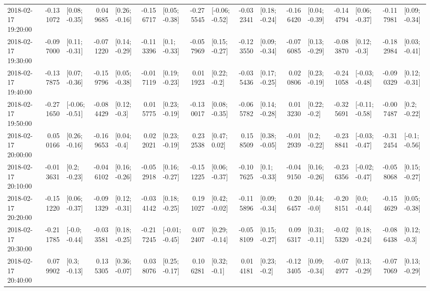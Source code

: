 \begin{tabular}{lrlrlrlrlrlrlrlrl}
2018-02-17 19:20:00 & -0.131072 &   [0.08; -0.35] &  0.049685 &   [0.26; -0.16] & -0.156717 &   [0.05; -0.38] & -0.275545 &  [-0.06; -0.52] & -0.032341 &   [0.18; -0.24] & -0.166420 &   [0.04; -0.39] & -0.144794 &   [0.06; -0.37] & -0.117981 &   [0.09; -0.34] \\
2018-02-17 19:30:00 & -0.097000 &   [0.11; -0.31] & -0.071220 &   [0.14; -0.29] & -0.113396 &    [0.1; -0.33] & -0.057969 &   [0.15; -0.27] & -0.123550 &   [0.09; -0.34] & -0.076085 &   [0.13; -0.29] & -0.083870 &    [0.12; -0.3] & -0.182984 &   [0.03; -0.41] \\
2018-02-17 19:40:00 & -0.137875 &   [0.07; -0.36] & -0.159796 &   [0.05; -0.38] & -0.017119 &   [0.19; -0.23] &  0.011923 &    [0.22; -0.2] & -0.035436 &   [0.17; -0.25] &  0.020806 &   [0.23; -0.19] & -0.241058 &  [-0.03; -0.48] & -0.090329 &   [0.12; -0.31] \\
2018-02-17 19:50:00 & -0.271650 &  [-0.06; -0.51] & -0.084429 &    [0.12; -0.3] &  0.015775 &   [0.23; -0.19] & -0.130017 &   [0.08; -0.35] & -0.065782 &   [0.14; -0.28] &  0.013230 &    [0.22; -0.2] & -0.325691 &  [-0.11; -0.58] & -0.007487 &    [0.2; -0.22] \\
2018-02-17 20:00:00 &  0.050166 &   [0.26; -0.16] & -0.169653 &    [0.04; -0.4] &  0.022021 &   [0.23; -0.19] &  0.232538 &    [0.47; 0.02] &  0.158509 &   [0.38; -0.05] & -0.012939 &    [0.2; -0.22] & -0.238841 &  [-0.03; -0.47] & -0.312454 &   [-0.1; -0.56] \\
2018-02-17 20:10:00 & -0.013631 &    [0.2; -0.23] & -0.046102 &   [0.16; -0.26] & -0.052918 &   [0.16; -0.27] & -0.151225 &   [0.06; -0.37] & -0.107625 &    [0.1; -0.33] & -0.049150 &   [0.16; -0.26] & -0.236356 &  [-0.02; -0.47] & -0.058068 &   [0.15; -0.27] \\
2018-02-17 20:20:00 & -0.151220 &   [0.06; -0.37] & -0.091329 &   [0.12; -0.31] & -0.034142 &   [0.18; -0.25] &  0.191027 &   [0.42; -0.02] & -0.115896 &   [0.09; -0.34] &  0.206457 &    [0.44; -0.0] & -0.208151 &    [0.0; -0.44] & -0.154629 &   [0.05; -0.38] \\
2018-02-17 20:30:00 & -0.211785 &   [-0.0; -0.44] & -0.033581 &   [0.18; -0.25] & -0.217245 &  [-0.01; -0.45] &  0.072407 &   [0.29; -0.14] & -0.058109 &   [0.15; -0.27] &  0.096317 &   [0.31; -0.11] & -0.025320 &   [0.18; -0.24] & -0.086438 &    [0.12; -0.3] \\
2018-02-17 20:40:00 &  0.079902 &    [0.3; -0.13] &  0.135305 &   [0.36; -0.07] &  0.038076 &   [0.25; -0.17] &  0.106281 &    [0.32; -0.1] &  0.014181 &    [0.23; -0.2] & -0.123405 &   [0.09; -0.34] & -0.074977 &   [0.13; -0.29] & -0.077069 &   [0.13; -0.29] \\

\end{tabular}
